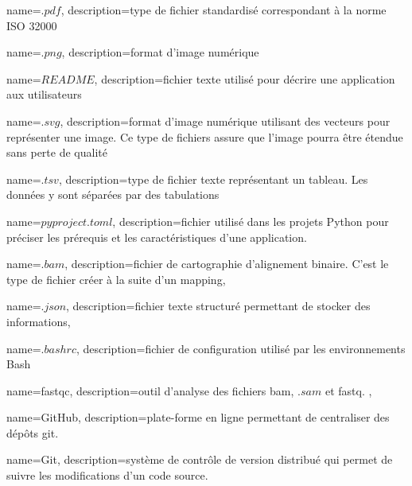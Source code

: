  {
    name=$.pdf$,
    description={type de fichier standardisé correspondant à la norme ISO 32000}
}
\newcommand{\pdf}{"\gls{pdf}"}

 {
    name=$.png$,
    description={format d'image numérique}
}
\newcommand{\png}{"\gls{png}"}

 {
    name=$README$,
    description={fichier texte utilisé pour décrire une application aux utilisateurs}
}
\newcommand{\readme}{\gls{readme}}


 {
   name=$.svg$,
    description={format d'image numérique utilisant des vecteurs pour représenter une image. Ce type de fichiers assure que l'image pourra être étendue sans perte de qualité }
}
\newcommand{\svg}{"\gls{svg}"}

 {
   name=$.tsv$,
    description={type de fichier texte représentant un tableau. Les données y sont séparées par des tabulations}
}
\newcommand{\tsv}{"\gls{tsv}"}

 {
   name=$pyproject.toml$,
    description={fichier utilisé dans les projets \gls{Python} pour préciser les prérequis et les caractéristiques d'une application.}
}

 {
    name=$.bam$,
    description={fichier de cartographie d'alignement binaire. C'est le type de fichier créer à la suite d'un \gls{mapping}},
}
\newcommand{\bam}{"\gls{bam}"}

 {
    name=$.json$,
    description={fichier texte structuré permettant de stocker des informations},
}
\newcommand{\json}{"\gls{json}"}

 {
    name=$.bashrc$,
    description={fichier de configuration utilisé par les environnements \gls{Bash}}
}

 {
    name=fastqc,
    description={outil d'analyse des fichiers \gls{bam}, $.sam$ et \gls{fastq}. \cite{fastqc}},
}
\newcommand{\fastqc}{\gls{fastqc}}

 {
    name=GitHub,
    description={plate-forme en ligne permettant de centraliser des dépôts \gls{git}. \cite{github}}
}
\newcommand{\GitHub}{\gls{GitHub}}

 {
    name=Git,
    description={système de contrôle de version distribué qui permet de suivre les modifications d'un code source. \cite{git}}
}

